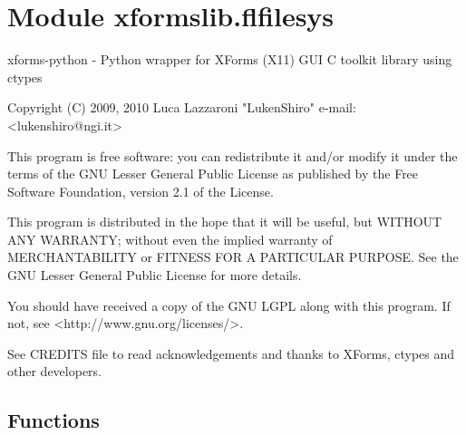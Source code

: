 %
%
%


\section{Module xformslib.flfilesys}

    \label{xformslib:flfilesys}
xforms-python - Python wrapper for XForms (X11) GUI C toolkit library using
ctypes

Copyright (C) 2009, 2010  Luca Lazzaroni "LukenShiro" e-mail: 
{\textless}lukenshiro@ngi.it{\textgreater}

This program is free software: you can redistribute it and/or modify it 
under the terms of the GNU Lesser General Public License as published by 
the Free Software Foundation, version 2.1 of the License.

This program is distributed in the hope that it will be useful, but WITHOUT
ANY WARRANTY; without even the implied warranty of MERCHANTABILITY or 
FITNESS FOR A PARTICULAR PURPOSE. See the GNU Lesser General Public License
for more details.

You should have received a copy of the GNU LGPL along with this program. If
not, see {\textless}http://www.gnu.org/licenses/{\textgreater}.

See CREDITS file to read acknowledgements and thanks to XForms, ctypes and 
other developers.



  \subsection{Functions}

    \label{xformslib:flfilesys:fl_get_dirlist}

